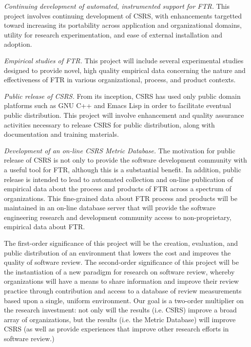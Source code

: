 \begin{itemizenoindent}
\item {\em Continuing development of automated, instrumented support for
  FTR.} This project involves continuing development of CSRS, with
  enhancements targetted toward increasing its portability across application
  and organizational domains, utility for research experimentation, and ease
  of external installation and adoption.
  
\item {\em Empirical studies of FTR.} This project will include several
  experimental studies designed to provide novel, high quality empirical
  data concerning the nature and effectiveness of FTR in various
  organizational, process, and product contexts.
  
\item {\em Public release of CSRS.} From its inception, CSRS has used
  only public domain platforms such as GNU C++ and Emacs Lisp in order to
  facilitate eventual public distribution.  This project will involve
  enhancement and quality assurance activities necessary to release CSRS
  for public distribution, along with documentation and training materials.
  
\item {\em Development of an on-line CSRS Metric Database.} The motivation
  for public release of CSRS is not only to provide the software development
  community with a useful tool for FTR, although this is a substantial
  benefit. In addition, public release is intended to lead to automated
  collection and on-line publication of empirical data about the process and
  products of FTR across a spectrum of organizations.  This fine-grained data
  about FTR process and products will be maintained in an on-line database
  server that will provide the software engineering research and development
  community access to non-proprietary, empirical data about FTR.

\end{itemizenoindent}

The first-order significance of this project will be the creation,
evaluation, and public distribution of an environment that lowers the cost
and improves the quality of software review.  The second-order significance
of this project will be the instantiation of a new paradigm for research on
software review, whereby organizations will have a means to share
information and improve their review practice through contribution and
access to a database of review measurements based upon a single, uniform
environment.  Our goal is a two-order multiplier on the research
investment: not only will the results (i.e. CSRS) improve a broad array of
organizations, but the results (i.e. the Metric Database) will improve CSRS (as
well as provide experiences that improve other research efforts in software
review.)

